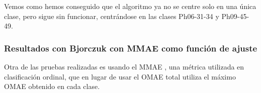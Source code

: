 Vemos como hemos conseguido que el algoritmo ya no se centre solo en una única clase, pero sigue sin funcionar, centrándose en las clases Ph06-31-34 y Ph09-45-49.

\newpage

\subsubsection{Resultados con Bjorczuk con MMAE como función de ajuste}

Otra de las pruebas realizadas es usando el MMAE \cite{funcionesClasificacionOrdinal}, una métrica utilizada en clasificación ordinal, que en lugar de usar el OMAE total utiliza el máximo OMAE obtenido en cada clase.


